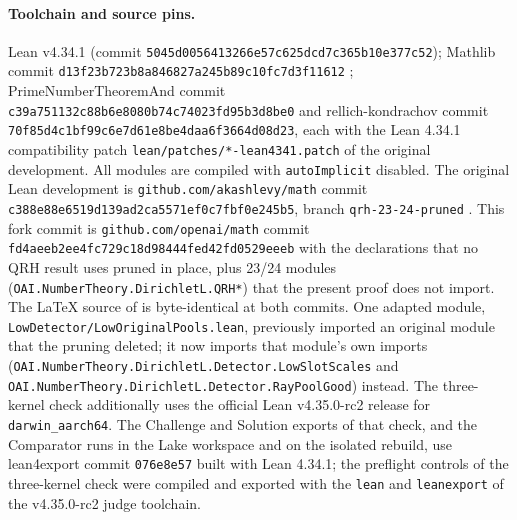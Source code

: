 \documentclass[11pt]{article}
\begin{document}
\paragraph{Toolchain and source pins.}
Lean v4.34.1 (commit
\nolinkurl{5045d0056413266e57c625dcd7c365b10e377c52}); Mathlib commit
\nolinkurl{d13f23b723b8a846827a245b89c10fc7d3f11612} \cite{mathlib};
PrimeNumberTheoremAnd commit
\nolinkurl{c39a751132c88b6e8080b74c74023fd95b3d8be0} and
rellich-kondrachov commit
\nolinkurl{70f85d4c1bf99c6e7d61e8be4daa6f3664d08d23}, each with the
Lean 4.34.1 compatibility patch \nolinkurl{lean/patches/*-lean4341.patch}
of the original development. All modules are compiled with
\nolinkurl{autoImplicit} disabled. The original Lean development is
\nolinkurl{github.com/akashlevy/math} commit
\nolinkurl{c388e88e6519d139ad2ca5571ef0c7fbf0e245b5}, branch
\nolinkurl{qrh-23-24-pruned} \cite{fork}. This fork commit is
\nolinkurl{github.com/openai/math} commit
\nolinkurl{fd4aeeb2ee4fc729c18d98444fed42fd0529eeeb} with the declarations
that no QRH result uses pruned in place, plus 23/24 modules
(\nolinkurl{OAI.NumberTheory.DirichletL.QRH*}) that the present proof
does not import. The \LaTeX{} source of \cite{openai} is byte-identical
at both commits. One adapted module,
\nolinkurl{LowDetector/LowOriginalPools.lean}, previously imported an
original module that the pruning deleted; it now imports that module's
own imports (\nolinkurl{OAI.NumberTheory.DirichletL.Detector.LowSlotScales}
and \nolinkurl{OAI.NumberTheory.DirichletL.Detector.RayPoolGood}) instead.
The three-kernel check additionally uses the official Lean v4.35.0-rc2
release for \nolinkurl{darwin_aarch64}. The Challenge and Solution
exports of that check, and the Comparator runs in the Lake workspace and
on the isolated rebuild, use lean4export commit \nolinkurl{076e8e57}
built with Lean 4.34.1; the preflight controls of the three-kernel check
were compiled and exported with the \nolinkurl{lean} and
\nolinkurl{leanexport} of the v4.35.0-rc2 judge toolchain.
\end{document}
